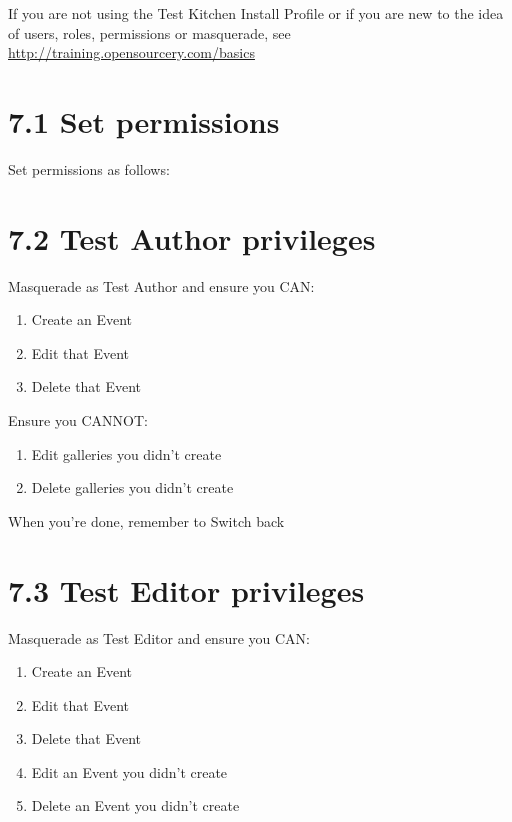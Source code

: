\documentclass[letterpaper,10pt,english]{sphinxmanual}
\begin{document}
If you are not using the Test Kitchen Install Profile or if you are new to the idea of users, roles, permissions or masquerade, see \href{http://training.opensourcery.com/basics}{http://training.opensourcery.com/basics}


\section{7.1 Set permissions}
\label{event_calendar:set-permissions}
Set permissions as follows:


\section{7.2 Test Author privileges}
\label{event_calendar:test-author-privileges}
Masquerade as Test Author and ensure you CAN:
\begin{enumerate}
\item {} 
Create an Event

\item {} 
Edit that Event

\item {} 
Delete that Event

\end{enumerate}

Ensure you CANNOT:
\begin{enumerate}
\item {} 
Edit galleries you didn’t create

\item {} 
Delete galleries you didn’t create

\end{enumerate}

When you’re done, remember to Switch back


\section{7.3 Test Editor privileges}
\label{event_calendar:test-editor-privileges}
Masquerade as Test Editor and ensure you CAN:
\begin{enumerate}
\item {} 
Create an Event

\item {} 
Edit that Event

\item {} 
Delete that Event

\item {} 
Edit an Event you didn’t create

\item {} 
Delete an Event you didn’t create

\end{enumerate}



\renewcommand{\indexname}{Index}
\printindex
\end{document}
